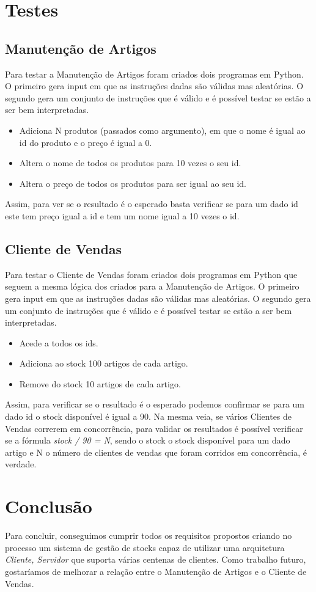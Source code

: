\documentclass[a4paper]{report}
\begin{document}
\chapter{Testes}

\section{Manutenção de Artigos}

Para testar a Manutenção de Artigos foram criados dois programas em Python.
O primeiro gera input em que as instruções dadas são válidas mas aleatórias.
O segundo gera um conjunto de instruções que é válido e é possível testar se estão
a ser bem interpretadas.
\begin{itemize} 
    \item Adiciona N produtos (passados como argumento), em que o nome é igual ao id do
        produto e o preço é igual a 0.
    \item Altera o nome de todos os produtos para 10 vezes o seu id.
    \item Altera o preço de todos os produtos para ser igual ao seu id.
\end{itemize}
Assim, para ver se o resultado é o esperado basta verificar se para um dado id
este tem preço igual a id e tem um nome igual a 10 vezes o id.

\section{Cliente de Vendas}

Para testar o Cliente de Vendas foram criados dois programas em Python que
seguem a mesma lógica dos criados para a Manutenção de Artigos.
O primeiro gera input em que as instruções dadas são válidas mas aleatórias.
O segundo gera um conjunto de instruções que é válido e é possível testar se estão
a ser bem interpretadas.
\begin{itemize} 
    \item Acede a todos os ids.
    \item Adiciona ao stock 100 artigos de cada artigo.
    \item Remove do stock 10 artigos de cada artigo.
\end{itemize}
Assim, para verificar se o resultado é o esperado podemos confirmar se para um dado
id o stock disponível é igual a 90.
Na mesma veia, se vários Clientes de Vendas correrem em concorrência, para validar
os resultados é possível verificar se a fórmula \textit{stock / 90 = N}, sendo o stock o stock
disponível para um dado artigo e N o número de clientes de vendas que foram corridos
em concorrência, é verdade.

\chapter{Conclusão}

Para concluir, conseguimos cumprir todos os requisitos propostos criando no processo um
sistema de gestão de stocks capaz de utilizar uma arquitetura \textit{Cliente, Servidor}
que suporta várias centenas de clientes.
Como trabalho futuro, gostaríamos de melhorar a relação entre o Manutenção de Artigos e
o Cliente de Vendas.
\end{document}
